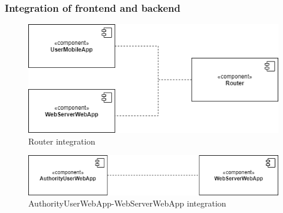         \subsubsection{Integration of frontend and backend}
            \begin{figure}[H]
                \includegraphics[scale=0.7]{dd/resources/images/Integration-Router.png}
                \caption{Router integration}        
            \end{figure}
            \begin{figure}[H]
                \includegraphics[scale=0.65]{dd/resources/images/Integration-Web.png}
                \caption{AuthorityUserWebApp-WebServerWebApp integration}        
            \end{figure}

